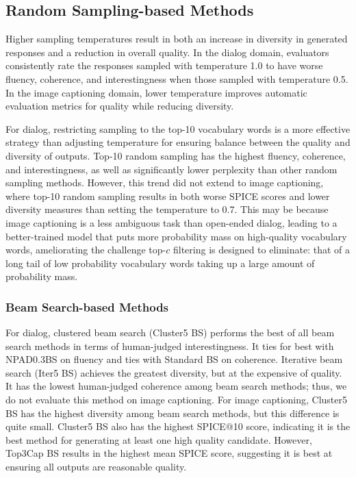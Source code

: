 \subsection{Random Sampling-based Methods}
Higher sampling temperatures result in both an increase in diversity in generated responses and a reduction in overall quality.
In the dialog domain, evaluators consistently rate the responses sampled with temperature 1.0 to have worse fluency, coherence, and interestingness when those sampled with temperature 0.5.
In the image captioning domain, lower temperature improves automatic evaluation metrics for quality while reducing diversity.

For dialog, restricting sampling to the top-10 vocabulary words is a more effective strategy than adjusting temperature for ensuring balance between the quality and diversity of outputs.
Top-10 random sampling has the highest fluency, coherence, and interestingness, as well as significantly lower perplexity than other random sampling methods.
However, this trend did not extend to image captioning, where top-10 random sampling results in both worse SPICE scores and lower diversity measures than setting the temperature to 0.7.
This may be because image captioning is a less ambiguous task than open-ended dialog, leading to a better-trained model that puts more probability mass on high-quality vocabulary words, ameliorating the challenge top-$c$ filtering is designed to eliminate: that of a long tail of low probability vocabulary words taking up a large amount of probability mass.

\subsubsection{Beam Search-based Methods}

For dialog, clustered beam search (Cluster5 BS) performs the best of all beam search methods in terms of human-judged interestingness. It ties for best with NPAD0.3BS on fluency and ties with Standard BS on coherence.
Iterative beam search (Iter5 BS) achieves the greatest diversity, but at the expensive of quality.
It has the lowest human-judged coherence among beam search methods; thus, we do not evaluate this method on image captioning.
For image captioning, Cluster5 BS has the highest diversity among beam search methods, but this difference is quite small.
Cluster5 BS also has the highest SPICE@10 score, indicating it is the best method for generating at least one high quality candidate.
However, Top3Cap BS results in the highest mean SPICE score, suggesting it is best at ensuring all outputs are reasonable quality.

